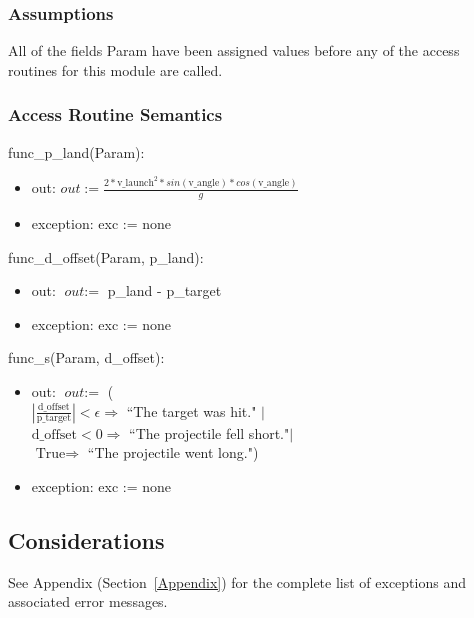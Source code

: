 \documentclass[12pt, titlepage]{article}
\begin{document}
\subsubsection{Assumptions}

All of the fields Param have been assigned values before any of the access
 routines for this module are called.

\subsubsection{Access Routine Semantics}

func\_p\_land(Param):
 \begin{itemize}
 \item out: $\textit{out} := \frac{2 * \text{v\_launch}^2 * sin(\text{v\_angle}) * cos(\text{v\_angle})}{g}$
 \item exception: exc := none
 \end{itemize}
 
func\_d\_offset(Param, p\_land):
 \begin{itemize}
 \item out: $\textit{out} := $ p\_land - p\_target
 \item exception: exc := none
 \end{itemize}
 
func\_s(Param, d\_offset):
 \begin{itemize}
 \item out: $\textit{out} := $ ( \\
$|\frac{\text{d\_offset}}{\text{p\_target}}| < \epsilon \Rightarrow$ ``The target was hit." $|$\\
$\text{d\_offset} < 0 \Rightarrow$ ``The projectile fell short."$|$\\
$\text{True} \Rightarrow$ ``The projectile went long.")
 \item exception: exc := none
 \end{itemize}

\subsection{Considerations}

See Appendix (Section~\ref{Appendix}) for the complete list of exceptions and
 associated error messages.
\end{document}
